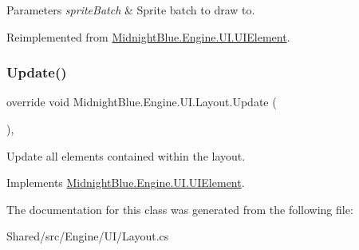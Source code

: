 \begin{DoxyParams}{Parameters}
{\em sprite\+Batch} & Sprite batch to draw to.\\
\hline
\end{DoxyParams}


Reimplemented from \hyperlink{class_midnight_blue_1_1_engine_1_1_u_i_1_1_u_i_element_a0faa27f642478cd428c4718f66263325}{Midnight\+Blue.\+Engine.\+U\+I.\+U\+I\+Element}.

\hypertarget{class_midnight_blue_1_1_engine_1_1_u_i_1_1_layout_a7f7c86af6689c117db5d106aa9fadcf2}{}\label{class_midnight_blue_1_1_engine_1_1_u_i_1_1_layout_a7f7c86af6689c117db5d106aa9fadcf2} 
\subsubsection{\texorpdfstring{Update()}{Update()}}
{\footnotesize\ttfamily override void Midnight\+Blue.\+Engine.\+U\+I.\+Layout.\+Update (\begin{DoxyParamCaption}{ }\end{DoxyParamCaption})\hspace{0.3cm}{\ttfamily [inline]}, {\ttfamily [virtual]}}



Update all elements contained within the layout. 



Implements \hyperlink{class_midnight_blue_1_1_engine_1_1_u_i_1_1_u_i_element_a5b2bff6eed644fc33bc3e1ffaa8bfc70}{Midnight\+Blue.\+Engine.\+U\+I.\+U\+I\+Element}.



The documentation for this class was generated from the following file\+:\begin{DoxyCompactItemize}
\item 
Shared/src/\+Engine/\+U\+I/Layout.\+cs\end{DoxyCompactItemize}
